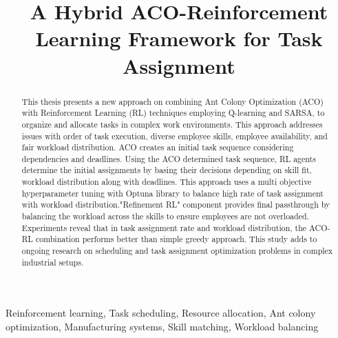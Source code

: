 \documentclass[conference]{IEEEtran}
\begin{document}
	\title{A Hybrid ACO-Reinforcement Learning Framework for Task Assignment\\

	}

	\author{ 
	\and {} 
	}

	\maketitle

	\begin{abstract}
		This thesis presents a new approach on combining Ant Colony Optimization (ACO)
		with Reinforcement Learning (RL) techniques employing Q-learning and SARSA,
		to organize and allocate tasks in complex work environments. This approach addresses
		issues with order of task execution, diverse employee skills, employee availability,
		and fair workload distribution. ACO creates an initial task sequence considering
		dependencies and deadlines. Using the ACO determined task sequence, RL agents
		determine the initial assignments by basing their decisions depending on skill
		fit, workload distribution along with deadlines. This approach uses a multi objective
		hyperparameter tuning with Optuna library to balance high rate of task assignment
		with workload distribution."Refinement RL" component provides final passthrough
		by balancing the workload across the skills to ensure employees are not overloaded.
		Experiments reveal that in task assignment rate and workload distribution, the
		ACO-RL combination performs better than simple greedy approach. This study
		adds to ongoing research on scheduling and task assignment optimization
		problems in complex industrial setups.
	\end{abstract}

	\begin{IEEEkeywords}
		Reinforcement learning, Task scheduling, Resource allocation, Ant colony
		optimization, Manufacturing systems, Skill matching, Workload balancing
	\end{IEEEkeywords}
\end{document}
